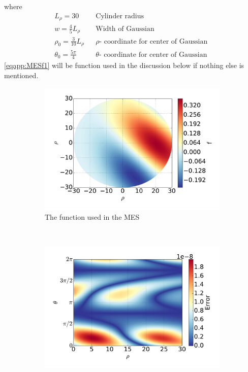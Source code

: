 %
where
%
\begin{align*}
    &L_\rho = 30&
    &\text{
        Cylinder radius
    }&
    \\
    &w = \frac{4}{5}L_\rho&
    &\text{
        Width of Gaussian
    }&
    \\
    &\rho_0 = \frac{3}{10}L_\rho&
    &
    \rho
    \text{
        - coordinate for center of Gaussian
    }&
    \\
    &\theta_0 = \frac{5\pi}{4}&
    &
    \theta
    \text{
        - coordinate for center of Gaussian
    }&
\end{align*}
%
\cref{eqapp:MESf1} will be function used in the discussion below if nothing else is mentioned.
%
\begin{figure}[t!]
    \centering
    \begin{subfigure}[t]{0.45\textwidth}
        \centering
        \includegraphics[width=1.0\textwidth]{fig/f}
        \caption{The function used in the MES}
    \end{subfigure}%
    ~
    \begin{subfigure}[t]{0.45\textwidth}
        \centering
        \includegraphics[width=1.0\textwidth]{fig/err}

\end{subfigure}
\end{figure}
